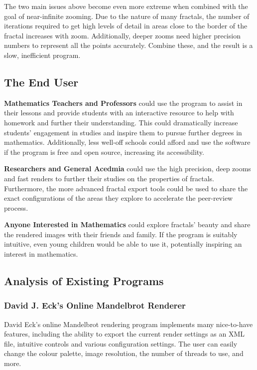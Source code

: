 The two main issues above become even more extreme when combined with the goal of near-infinite zooming. Due to the nature of many fractals, the number of iterations required to get high levels of detail in areas close to the border of the fractal increases with zoom. Additionally, deeper zooms need higher precision numbers to represent all the points accurately. Combine these, and the result is a slow, inefficient program.

\subsection{The End User}

\vspace{0.25cm}
\noindent
\textbf{Mathematics Teachers and Professors} could use the program to assist in their lessons and provide students with an interactive resource to help with homework and further their understanding. This could dramatically increase students' engagement in studies and inspire them to pursue further degrees in mathematics. Additionally, less well-off schools could afford and use the software if the program is free and open source, increasing its accessibility.

\vspace{0.25cm}
\noindent
\textbf{Researchers and General Acedmia} could use the high precision, deep zooms and fast renders to further their studies on the properties of fractals. Furthermore, the more advanced fractal export tools could be used to share the exact configurations of the areas they explore to accelerate the peer-review process.

\vspace{0.25cm}
\noindent
\textbf{Anyone Interested in Mathematics} could explore fractals' beauty and share the rendered images with their friends and family. If the program is suitably intuitive, even young children would be able to use it, potentially inspiring an interest in mathematics.

\subsection{Analysis of Existing Programs}

\subsubsection{David J. Eck's Online Mandelbrot Renderer \cite{eck}}

David Eck's online Mandelbrot rendering program implements many nice-to-have features, including the ability to export the current render settings as an XML file, intuitive controls and various configuration settings. The user can easily change the colour palette, image resolution, the number of threads to use, and more.

